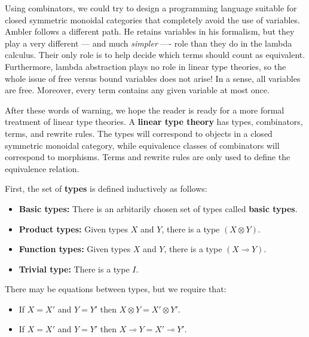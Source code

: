 \documentclass[12pt,twoside,openright]{report}
\newcommand{\lhom}{\multimap}
\newcommand{\tensor}{\otimes}
\begin{document}
Using combinators, we could try to design a programming language suitable for closed symmetric monoidal categories that completely avoid the use of variables.  Ambler follows a different path.  He retains variables in his formalism, but they play a very different ---
and much {\it simpler} ---- role than they do in the lambda calculus. Their only role is to help decide which terms should count as equivalent.  Furthermore, lambda abstraction plays no role in linear type theories, so the whole issue of free versus bound variables does not arise!  In a sense, all variables are free.  Moreover, every term contains any given variable at most once.

After these words of warning, we hope the reader is ready for a more formal treatment of linear type theories.  A {\bf linear type theory}
has types, combinators, terms, and rewrite rules.  The types will correspond to objects in a closed symmetric monoidal category, while equivalence classes of combinators will correspond to morphisms. Terms and rewrite rules are only used to define the equivalence relation.

First, the set of {\bf types} is defined inductively as follows:
\begin{itemize}
\item {\bf Basic types:}
There is an arbitarily chosen set of types called {\bf basic types}.
\item {\bf Product types:}
Given types $X$ and $Y$, there is a type $(X \tensor Y)$.
\item {\bf Function types:}
Given types $X$ and $Y$, there is a type $(X \lhom Y)$.
\item {\bf Trivial type:} There is a type $I$.
\end{itemize}
There may be equations between types, but we require that:
\begin{itemize}
\item If $X = X'$ and $Y = Y'$ then $X \tensor Y = X' \tensor Y'$.
\item If $X = X'$ and $Y = Y'$ then $X \lhom Y = X' \lhom Y'$.
\end{itemize}
\end{document}
